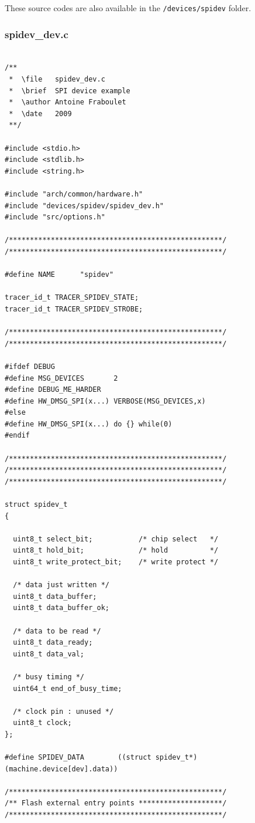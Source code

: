 \documentclass[a4paper,10pt]{report}
\begin{document}
These source codes are also available in the \verb$/devices/spidev$ folder.

\subsubsection{spidev\_dev.c}
\begin{verbatim}

/**
 *  \file   spidev_dev.c
 *  \brief  SPI device example
 *  \author Antoine Fraboulet
 *  \date   2009
 **/

#include <stdio.h>
#include <stdlib.h>
#include <string.h>

#include "arch/common/hardware.h"
#include "devices/spidev/spidev_dev.h"
#include "src/options.h"

/***************************************************/
/***************************************************/

#define NAME      "spidev"

tracer_id_t TRACER_SPIDEV_STATE;
tracer_id_t TRACER_SPIDEV_STROBE;

/***************************************************/
/***************************************************/

#ifdef DEBUG
#define MSG_DEVICES       2
#define DEBUG_ME_HARDER
#define HW_DMSG_SPI(x...) VERBOSE(MSG_DEVICES,x)
#else
#define HW_DMSG_SPI(x...) do {} while(0)
#endif

/***************************************************/
/***************************************************/
/***************************************************/

struct spidev_t 
{

  uint8_t select_bit;           /* chip select   */
  uint8_t hold_bit;             /* hold          */
  uint8_t write_protect_bit;    /* write protect */

  /* data just written */
  uint8_t data_buffer;
  uint8_t data_buffer_ok;

  /* data to be read */
  uint8_t data_ready;
  uint8_t data_val;
  
  /* busy timing */
  uint64_t end_of_busy_time;

  /* clock pin : unused */
  uint8_t clock;
};

#define SPIDEV_DATA        ((struct spidev_t*)(machine.device[dev].data))

/***************************************************/
/** Flash external entry points ********************/
/***************************************************/


\end{verbatim}
\end{document}
